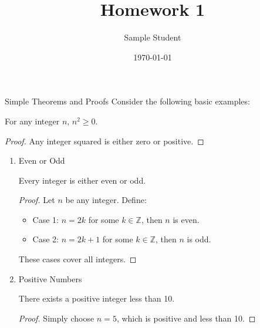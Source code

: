 \documentclass{homework}
\author{Sample Student}
\title{Homework 1}
\date{\today}
\begin{document}
 \maketitle

\question Simple Theorems and Proofs
Consider the following basic examples:

\begin{theorem}
For any integer $n$, $n^2 \geq 0$.
\end{theorem}
\begin{proof}
Any integer squared is either zero or positive. 
\end{proof}

\begin{enumerate}[label=\alph*)]
	\item Even or Odd
	      \begin{theorem}
		      Every integer is either even or odd.
	      \end{theorem}
	      \begin{sol}
		      \begin{proof}
			      Let $n$ be any integer. Define:
			      \begin{itemize}
				      \item Case 1: $n = 2k$ for some $k \in \mathbb{Z}$, then $n$ is even.
				      \item Case 2: $n = 2k + 1$ for some $k \in \mathbb{Z}$, then $n$ is odd.
			      \end{itemize}
			      These cases cover all integers.
		      \end{proof}
	      \end{sol}

	\item Positive Numbers
	      \begin{theorem}
		      There exists a positive integer less than 10.
	      \end{theorem}
	      \begin{sol}
		      \begin{proof}
			      Simply choose $n = 5$, which is positive and less than 10.
		      \end{proof}
	      \end{sol}
\end{enumerate}
\end{document}

